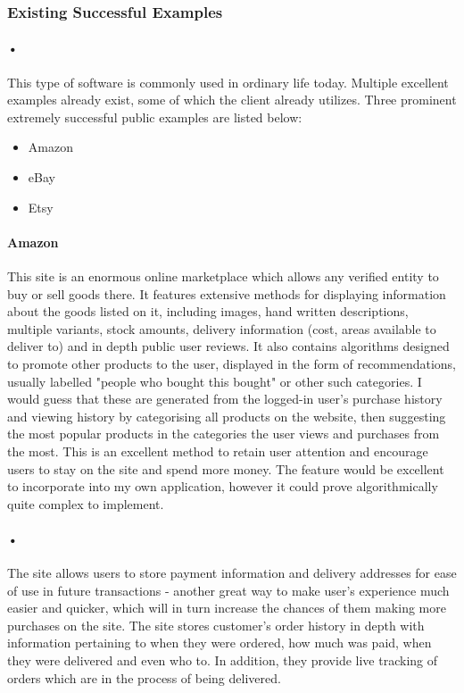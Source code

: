 \documentclass{article}
\begin{document}
    \subsubsection{Existing Successful Examples}
    \paragraph{•}
    This type of software is commonly used in ordinary life today.
    Multiple excellent examples already exist, some of which the client already utilizes.
    Three prominent extremely successful public examples are listed below:
    \begin{itemize}
    \item Amazon
    \item eBay
    \item Etsy
    \end{itemize}
    \paragraph{Amazon}
    This site is an enormous online marketplace which allows any verified entity to buy or sell goods there.
    It features extensive methods for displaying information about the goods listed on it, including images, hand written descriptions, multiple variants, stock amounts, delivery information (cost, areas available to deliver to) and in depth public user reviews.
    It also contains algorithms designed to promote other products to the user, displayed in the form of recommendations, usually labelled "people who bought this bought" or other such categories.
    I would guess that these are generated from the logged-in user's purchase history and viewing history by categorising all products on the website, then suggesting the most popular products in the categories the user views and purchases from the most.
    This is an excellent method to retain user attention and encourage users to stay on the site and spend more money.
    The feature would be excellent to incorporate into my own application, however it could prove algorithmically quite complex to implement.
    \paragraph{•}
    The site allows users to store payment information and delivery addresses for ease of use in future transactions - another great way to make user's experience much easier and quicker, which will in turn increase the chances of them making more purchases on the site.
    The site stores customer's order history in depth with information pertaining to when they were ordered, how much was paid, when they were delivered and even who to.
    In addition, they provide live tracking of orders which are in the process of being delivered.
\end{document}

